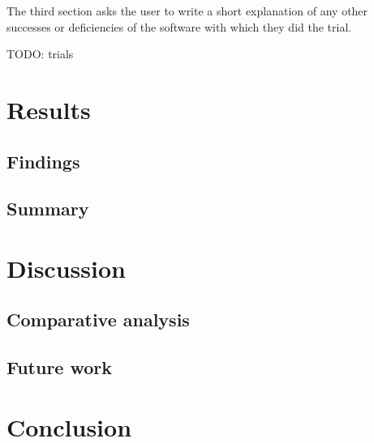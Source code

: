 \documentclass{sigchi}
\begin{document}
  The third section asks the user to write a short explanation of any other
  successes or deficiencies of the software with which they did the trial.

{\color{red} TODO: trials}

\section{Results}
 \subsection{Findings}
 \subsection{Summary}
\section{Discussion}
 \subsection{Comparative analysis}
 \subsection{Future work}
\section{Conclusion}



\end{document}

